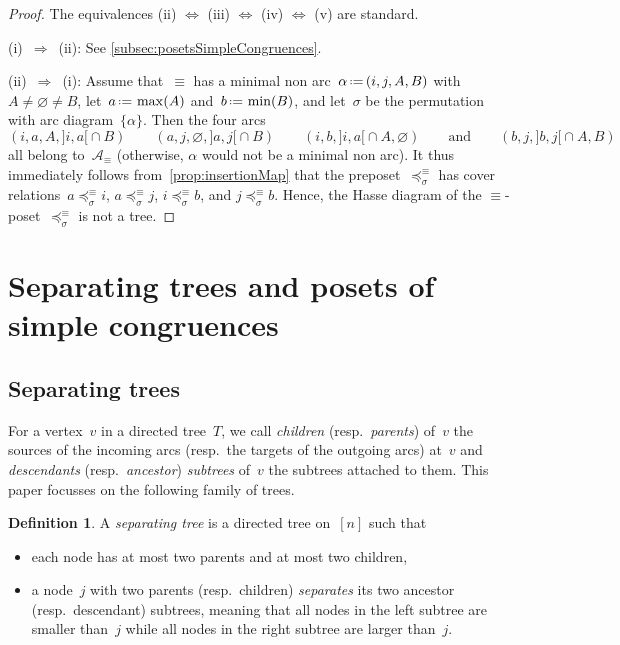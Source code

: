 \documentclass{amsart}
\theoremstyle{definition}
\newtheorem{definition}[theorem]{Definition}
\newcommand{\eqdef}{\mbox{\,\raisebox{0.2ex}{\scriptsize\ensuremath{\mathrm:}}\ensuremath{=}\,}} %
\newcommand{\darkblue}{\color{darkblue}} %
\newcommand{\defn}[1]{\textsl{\darkblue #1}} %
\newcommand{\arcs}{{\mathcal{A}}} %
\begin{document}
\begin{proof}
The equivalences (ii) $\iff$ (iii) $\iff$ (iv) $\iff$ (v) are standard.

(i)~$\Longrightarrow$~(ii): See \cref{subsec:posetsSimpleCongruences}.

(ii)~$\Longrightarrow$~(i): Assume that~$\equiv$ has a minimal non arc~$\alpha \eqdef (i, j, A, B)$ with~$A \ne \varnothing \ne B$, let~$a \eqdef \max(A)$ and~$b \eqdef \min(B)$, and let~$\sigma$ be the permutation with arc diagram~$\{\alpha\}$. Then the four arcs
\[
(i, a, A, {]i,a[} \cap B)
\qquad
(a, j, \varnothing, {]a,j[} \cap B)
\qquad
(i, b, {]i,a[} \cap A, \varnothing)
\qquad\text{and}\qquad
(b, j, {]b,j[} \cap A, B)
\]
all belong to~$\arcs_\equiv$ (otherwise, $\alpha$ would not be a minimal non arc).
It thus immediately follows from~\cref{prop:insertionMap} that the preposet~$\preccurlyeq_\sigma^\equiv$ has cover relations~$a \preccurlyeq_\sigma^\equiv i$, $a \preccurlyeq_\sigma^\equiv j$, $i \preccurlyeq_\sigma^\equiv b$, and $j \preccurlyeq_\sigma^\equiv b$.
Hence, the Hasse diagram of the $\equiv$-poset~$\preccurlyeq_\sigma^\equiv$ is not a tree.
\end{proof}


\section{Separating trees and posets of simple congruences}
\label{sec:separatingTreesPostesSimpleCongruences}


\subsection{Separating trees}
\label{sec:separatingTrees}

For a vertex~$v$ in a directed tree~$T$, we call \defn{children} (resp.~\defn{parents}) of~$v$ the sources of the incoming arcs (resp.~the targets of the outgoing arcs) at~$v$ and \defn{descendants} (resp.~\defn{ancestor}) \defn{subtrees} of~$v$ the subtrees attached to them.
This paper focusses on the following family of trees.

\begin{definition}
\label{def:separatingTree}
A \defn{separating tree} is a directed tree on~$[n]$ such that
\begin{itemize}
\item each node has at most two parents and at most two children,
\item a node~$j$ with two parents (resp.~children) \defn{separates} its two ancestor (resp.~descendant) subtrees, meaning that all nodes in the left subtree are smaller than~$j$ while all nodes in the right subtree are larger than~$j$.
\end{itemize}
\end{definition}
\end{document}
